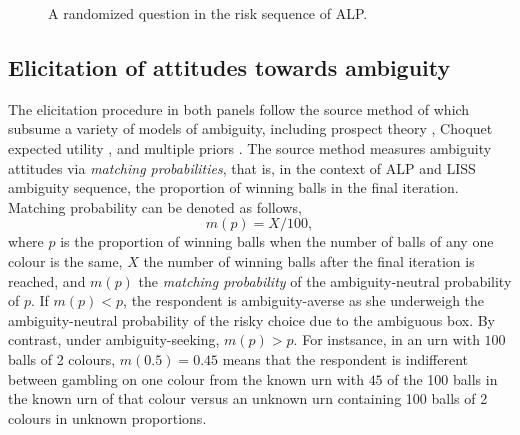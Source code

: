 \documentclass[]{article}
\begin{document}
\begin{figure}[!ht]
	\setlength{\fboxrule}{1.5pt}
	\setlength{\fboxsep}{0pt}
	\caption{A randomized question in the risk sequence of ALP.}
	\label{fig:2}
\end{figure} 


\subsection{Elicitation of attitudes towards ambiguity}
The elicitation procedure in both panels follow the source method of \citet{abdellaoui2011} which subsume a variety of models of ambiguity, including prospect theory \citep{tversky1992advances}, Choquet expected utility \citep{schmeidler1989subjective}, and multiple priors \citep{gilboa1989maxmin}. The source method measures ambiguity attitudes via \textit{matching probabilities}, that is, in the context of ALP and LISS ambiguity sequence, the proportion of winning balls in the final iteration. Matching probability can be denoted as follows,
\[m(p)=X/100,\]
where $p$ is the proportion of winning balls when the number of balls of any one colour is the same, $X$ the number of winning balls after the final iteration is reached, and $m(p)$ the \textit{matching probability} of the ambiguity-neutral probability of $p$. If $m(p)<p$, the respondent is ambiguity-averse as she underweigh the ambiguity-neutral probability of the risky choice due to the ambiguous box. By contrast, under ambiguity-seeking, $m(p)>p$. For instsance, in an urn with $100$ balls of 2 colours, $m(0.5)=0.45$ means that the respondent is indifferent between gambling on one colour from the known urn with $45$ of the 100 balls in the known urn of that colour versus an unknown urn containing 100 balls of 2 colours in unknown proportions.   
\end{document}

